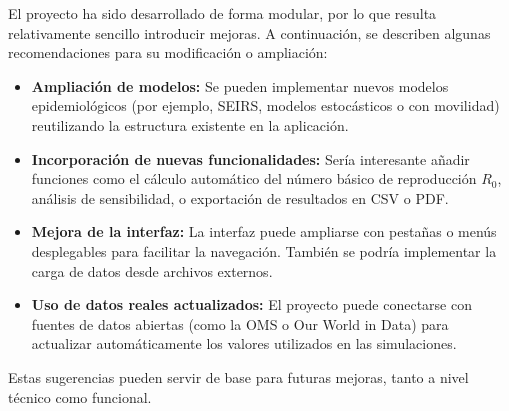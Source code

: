 El proyecto ha sido desarrollado de forma modular, por lo que resulta relativamente sencillo introducir mejoras. A continuación, se describen algunas recomendaciones para su modificación o ampliación:

\begin{itemize}
    \item \textbf{Ampliación de modelos:} Se pueden implementar nuevos modelos epidemiológicos (por ejemplo, SEIRS, modelos estocásticos o con movilidad) reutilizando la estructura existente en la aplicación.

    \item \textbf{Incorporación de nuevas funcionalidades:} Sería interesante añadir funciones como el cálculo automático del número básico de reproducción \( R_0 \), análisis de sensibilidad, o exportación de resultados en CSV o PDF.

    \item \textbf{Mejora de la interfaz:} La interfaz puede ampliarse con pestañas o menús desplegables para facilitar la navegación. También se podría implementar la carga de datos desde archivos externos.

    \item \textbf{Uso de datos reales actualizados:} El proyecto puede conectarse con fuentes de datos abiertas (como la OMS o Our World in Data) para actualizar automáticamente los valores utilizados en las simulaciones.


\end{itemize}

Estas sugerencias pueden servir de base para futuras mejoras, tanto a nivel técnico como funcional.




